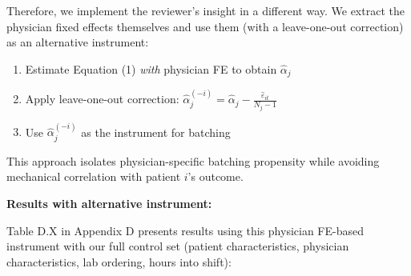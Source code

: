 \documentclass[11pt]{article}
\newcommand{\1}{\hbox{\rm 1\kern-.35em 1}}
\begin{document}
Therefore, we implement the reviewer's insight in a different way. We extract the physician fixed effects themselves and use them (with a leave-one-out correction) as an alternative instrument:
\begin{enumerate}
\item Estimate Equation (1) \textit{with} physician FE to obtain $\hat{\alpha}_j$
\item Apply leave-one-out correction: $\hat{\alpha}_j^{(-i)} = \hat{\alpha}_j - \frac{\hat{\varepsilon}_{it}}{N_j - 1}$
\item Use $\hat{\alpha}_j^{(-i)}$ as the instrument for batching
\end{enumerate}
This approach isolates physician-specific batching propensity while avoiding mechanical correlation with patient $i$'s outcome.

\textbf{Results with alternative instrument:}

Table D.X in Appendix D presents results using this physician FE-based instrument with our full control set (patient characteristics, physician characteristics, lab ordering, hours into shift):
\end{document}
